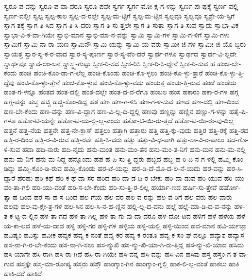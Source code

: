 {ಸ್ವರೂ-ಪ-ವನ್ನು
ಸ್ವರೂ-ಪ-ವಾ-ದರೂ
ಸ್ವರೂ-ಪವೇ
ಸ್ವರ್ಗ
ಸ್ವರ್ಗ-ಮೋ-ಕ್ಷ-ಗ-ಳನ್ನು
ಸ್ವರ್ಣ-ಪು-ಷ್ಪಕ್ಕೆ
ಸ್ವರ್ಣ-ವಲ್ಲಿ
ಸ್ವರ್ಣ-ವಲ್ಲೀ
ಸ್ವಲ್ಪ
ಸ್ವಲ್ಪ-ಕಾಲ
ಸ್ವಲ್ಪ-ದ-ರಲ್ಲೇ
ಸ್ವಲ್ಪ-ಮ-ಟ್ಟಿಗೆ
ಸ್ವಲ್ಪ-ಮ-ಟ್ಟಿನ
ಸ್ವಲ್ಪವೂ
ಸ್ವಲ್ವವೂ
ಸ್ವಶ್ರೇ-ಯ-ಸ್ಸಿಗೆ
ಸ್ವಾಗ-ತಕ್ಕೆ
ಸ್ವಾಗ-ತಿ-ಸಿದ
ಸ್ವಾಗ-ತಿ-ಸಿ-ದರು
ಸ್ವಾಗ-ತಿ-ಸು-ತ್ತಲೇ
ಸ್ವಾಗ-ತಿ-ಸುತ್ತಾ
ಸ್ವಾಗ-ತಿ-ಸುವ
ಸ್ವಾದು
ಸ್ವಾಭಾ-ವಿಕ
ಸ್ವಾಭಾ-ವಿ-ಕ-ವಾ-ಗಿಯೇ
ಸ್ವಾಭಿ-ಮಾನ
ಸ್ವಾಭಿ-ಮಾ-ನ-ವನ್ನು
ಸ್ವಾಮಿ
ಸ್ವಾಮಿ-ಗಳ
ಸ್ವಾಮಿ-ಗ-ಳಿಗೆ
ಸ್ವಾಮಿ-ಗಳು
ಸ್ವಾಮಿಗೆ
ಸ್ವಾಮಿ-ನಾ-ರಾ-ಯಣ
ಸ್ವಾಮಿನೌ
ಸ್ವಾಮಿ-ಯನ್ನು
ಸ್ವಾಮಿ-ಯ-ವರು
ಸ್ವಾಮೀ-ಜಿ-ಗಳ
ಸ್ವಾಮೀ-ಜಿ-ಯೊ-ಬ್ಬರು
ಸ್ವಾಯತ್ತ
ಸ್ವಾರ-ಸ್ಯ-ಕ-ರ-ವಾದ
ಸ್ವಾರ-ಸ್ಯ-ಪೂರ್ಣ
ಸ್ವಾರ-ಸ್ಯ-ವೆಂ-ದರೆ
ಸ್ವಾರ್ಥ-ಗಳೂ
ಸ್ವಾರ್ಥದ
ಸ್ವಾರ್ಥ-ವಿ-ಲ್ಲದೇ
ಸ್ವಾರ್ಥವೂ
ಸ್ವಾವ-ಲಂ-ಬನ
ಸ್ವಾಸ್ಥ್ಯ-ಗುಟ್ಟು
ಸ್ವೀಕ-ರಿ-ಸದ
ಸ್ವೀಕ-ರಿಸಿ
ಸ್ವೀಕ-ರಿ-ಸಿ-ದ್ದೇನೆ
ಸ್ವೀಕ-ರಿ-ಸುವ
ಹ
ಹಂಚ-ಬೇ-ಕೆಂದು
ಹಂಚಿ
ಹಂಚಿ-ಕೊಂ-ಡಾ-ಗ-ಲೆಲ್ಲ
ಹಂಚಿ-ಕೊಂಡು
ಹಂಚಿ-ಕೊ-ಳ್ಳಲು
ಹಂಚಿ-ಕೊ-ಳ್ಳು-ತ್ತಾರೆ
ಹಂಚಿ-ಕೊ-ಳ್ಳು-ತ್ತಿ-ದ್ದೆವು
ಹಂಚಿ-ಕೊ-ಳ್ಳು-ತ್ತೇನೆ
ಹಂಚಿ-ಕೊ-ಳ್ಳುವ
ಹಂಚಿ-ಕೊ-ಳ್ಳು-ವದು
ಹಂಚುತ್ತ
ಹಂಚು-ತ್ತಿ-ರುವ
ಹಂಡೆ
ಹಂಡೆಯ
ಹಂತ-ಗ-ಳನ್ನೂ
ಹಂತದ
ಹಂತ-ದಲ್ಲಿ
ಹಂತ-ದಲ್ಲೇ
ಹಂತ-ದ-ವ-ರೆಗೂ
ಹಂಬಲ
ಹಂಸ
ಹಕಾರಂ
ಹಕಾ-ರ-ಗಳ
ಹಗ್ಗ
ಹಗ್ಗ-ವನ್ನು
ಹಚ್ಚ
ಹಚ್ಚಿ
ಹಚ್ಚಿ-ಕೊಂ-ಡಿದ್ದ
ಹಠ
ಹಣ
ಹಣ-ಗ-ಳಿಸಿ
ಹಣ-ಗ-ಳಿ-ಸುವ
ಹಣದ
ಹಣ-ದಲ್ಲಿ
ಹಣ-ದಿಂದ
ಹಣ-ಬೇ-ಕೆಂದು
ಹಣ-ವನ್ನು
ಹಣ-ವಿ-ದ್ದಾಗ
ಹಣ-ವಿ-ಲ್ಲ-ದಿ-ದ್ದಲ್ಲಿ
ಹಣವು
ಹಣ್ಣನ್ನು
ಹಣ್ಣಿನ
ಹಣ್ಣು-ಗ-ಳನ್ನು
ಹತೈ-ಷಿ-ಗಳೂ
ಹತೋ-ಟಿ-ಯನ್ನೇ
ಹತೋ-ಟಿ-ಯ-ಲ್ಲಿ-ಲ್ಲ-ಎಂದು
ಹತೋ-ಟಿ-ಯಿ-ರು-ತ್ತದೆ
ಹತೋ-ಟಿ-ಯಿ-ರು-ವು-ದಿಲ್ಲ
ಹತ್ತನೆ
ಹತ್ತ-ನೆಯ
ಹತ್ತನೇ
ಹತ್ತ-ನೇ-ಕ್ಲಾಸ್
ಹತ್ತಲು
ಹತ್ತಾಗಿ
ಹತ್ತಾರು
ಹತ್ತಿ
ಹತ್ತಿ-ಕ್ಕು-ವುದು
ಹತ್ತಿರ
ಹತ್ತಿ-ರಕ್ಕೆ
ಹತ್ತಿ-ರದ
ಹತ್ತಿ-ರ-ದಿಂದ
ಹತ್ತಿ-ರ-ವಿ-ರುವ
ಹತ್ತಿ-ರವೇ
ಹತ್ತಿ-ಸಿ-ದರು
ಹತ್ತು
ಹತ್ತು-ವಿ-ಧ-ವಾಗಿ
ಹತ್ತು-ಸಾ-ವಿ-ರ-ಪಾಲು
ಹದ-ಗೊ-ಳಿ-ಸುವ
ಹದಾ
ಹದಿ-ನಾರು
ಹದಿ-ನೈದು
ಹನು-ಮಂತ
ಹನು-ಮಂ-ತನ
ಹನು-ಮಂ-ತ-ನಿಗೆ
ಹನು-ಮನ
ಹನು-ಮ-ನಲ್ಲಿ
ಹನು-ಮ-ನಿಗೆ
ಹನು-ಮ-ನಿದ್ದ
ಹನ್ನೊಂದು
ಹಪ-ಹ-ಪಿ-ಸು-ತ್ತಿ-ದ್ದರು
ಹಬ್ಬದ
ಹಬ್ಬ-ಹ-ರಿ-ದಿ-ನ-ಗ-ಳಲ್ಲಿ
ಹಮ್ಮಿ-ಕೊಂ-ಡಿದ್ದು
ಹಮ್ಮಿ-ಕೊಂ-ಡಿ-ರುವ
ಹಮ್ಮಿ-ಕೊಂಡು
ಹರ-ಟೆ-ಯನ್ನು
ಹರ-ಡಿ-ದೆ-ಮೊ-ದ-ಲ-ನೆ-ಯದು
ಹರ-ವನ್ನು
ಹರ-ಸಿ-ದ್ದಾರೆ
ಹರಹು
ಹರಿ-ಕಥೆ
ಹರಿ-ಕ-ಥೆ-ದಾ-ಸರ
ಹರಿದ
ಹರಿ-ದಾ-ಡ-ದಿ-ರ-ಬೇಕು
ಹರಿ-ದಾ-ಡುವ
ಹರಿ-ಯುವ
ಹರಿ-ಯು-ವಂ-ತಾ-ಗಲಿ
ಹರಿ-ಯು-ವಂತೆ
ಹರಿ-ಸ-ಬೇ-ಕೆಂದು
ಹರಿ-ಸು-ತ್ತಿ-ರ-ಲಿಲ್ಲ
ಹರ್ಯಾ-ಣದ
ಹರ್ಷಿ-ಸು-ತ್ತೇವೆ
ಹರ್ಷೋ-ತ್ಸಾ-ಹ-ದಿಂದ
ಹರ-ಸಾ-ಹ-ಸ-ದಿಂದ
ಹಲ-ಗೆಯ
ಹಲ-ವರ
ಹಲ-ವ-ರನ್ನು
ಹಲ-ವ-ರಿಗೆ
ಹಲ-ವರು
ಹಲ-ವಾರು
ಹಲವು
ಹಲ-ವು-ಕ್ಷೇ-ತ್ರ-ಗಳ
ಹಲ-ಸಿನ
ಹಲ-ಸಿ-ನ-ಹ-ಣ್ಣಿನ
ಹಲ್ಲಿ-ಲ್ಲ-ದ-ವನು
ಹಲ್ಲೆ
ಹಲ್ಲೆ-ಮಾ-ಡಿ-ದ-ವ-ನನ್ನು
ಹಳ-ತ-ಕ-ಟ್ಟ-ದ-ಲ್ಲಿನ
ಹಳ-ತಾ-ಗದ
ಹಳ-ತಾ-ಗಿಲ್ಲ
ಹಳ-ತಾ-ಗು-ವು-ದಾ-ದರೂ
ಹಳ-ದೋ-ಟದ
ಹಳಿಗೆ
ಹಳೆ
ಹಳೆಯ
ಹಳೆ-ಯ-ಕಾ-ಲದ
ಹಳೆ-ಯ-ದಾದ
ಹಳ್ಳಿ
ಹಳ್ಳಿ-ಗರ
ಹಳ್ಳಿ-ಗಳ
ಹಳ್ಳಿಯ
ಹಳ್ಳಿ-ಯಲ್ಲಿ
ಹಳ್ಳಿ-ಯಿಂದ
ಹವ-ಮಾನ
ಹವಿ-ರ್ಯಜ್ಞಾ
ಹವಿಷ್ಯಂ
ಹವಿಸ್ಸು
ಹವೀಕ
ಹವ್ಯಕ
ಹವ್ಯ-ಕ-ನಂತೆ
ಹವ್ಯ-ಕರ
ಹವ್ಯ-ಕ-ರಂತೂ
ಹವ್ಯ-ಕ-ಸಂ-ಘ-ದಲ್ಲೂ
ಹವ್ಯಾಶ
ಹವ್ಯಾಸ
ಹಸ-ನಾ-ಗಿ-ರ-ಬೇ-ಕೆಂದು
ಹಸ-ನಾ-ಗಿ-ಸಲು
ಹಸ-ನ್ಮುಖಿ
ಹಸ-ನ್ಮು-ಖಿ-ಯಾ-ಗಿ-ರು-ತ್ತಿದ್ದ
ಹಸ-ನ್ಮು-ಖಿ-ಯಾದ
ಹಸಿದು
ಹಸಿ-ಯಾಗೇ
ಹಸಿ-ರಾಗಿ
ಹಸಿ-ರಾ-ಗಿದೆ
ಹಸಿ-ರಾ-ಗಿಯೇ
ಹಸಿ-ವನ್ನ
ಹಸಿ-ವನ್ನು
ಹಸಿ-ವಿನ
ಹಸಿವು
ಹಸ್ತ
ಹಸ್ತಂ-ಗ-ತ-ವಾ-ಗುವ
ಹಸ್ತಕ್ಕೇ
ಹಸ್ತ-ಮಾ-ರೋಪ್ಯ
ಹಸ್ತರು
ಹಸ್ತೌ
ಹಾಂಗ್ಕಾಂ-ಗಿನ
ಹಾಂಗ್ಕಾಂ-ಗ್ನಲ್ಲಿ
ಹಾಕ-ಲಿ-ಲ್ಲ-ವಂತೆ
ಹಾಕಲು
ಹಾಕಿ
ಹಾಕಿ-ದರೆ
ಹಾಕಿದೆ
}
